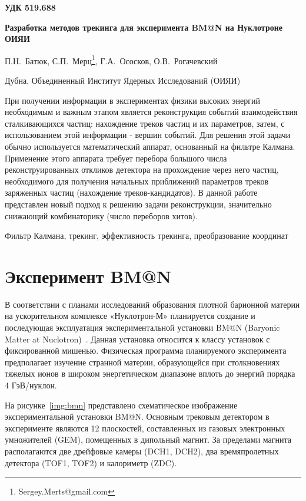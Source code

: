 \documentclass[a4paper, 12pt]{extreport}  %
\begin{document}
\begin{flushleft}
{\bf УДК 519.688}
\end{flushleft}
\begin{center}
\textbf{{Разработка методов трекинга для эксперимента BM@N на Нуклотроне ОИЯИ}}
\newline

П.Н.~Батюк, С.П.~Мерц\footnote{Sergey.Merts@gmail.com}, Г.А.~Ососков, О.В.~Рогачевский
\newline 

Дубна, Объединенный Институт Ядерных Исследований (ОИЯИ)
\end{center}

При получении информации в экспериментах физики высоких энергий необходимым и
важным этапом является реконструкция событий взаимодействия сталкивающихся
частиц: нахождение треков частиц и их параметров, затем, с использованием этой
информации - вершин событий. Для решения этой задачи обычно используется 
математический аппарат, основанный на фильтре Калмана. Применение этого аппарата
требует перебора большого числа реконструированных откликов детектора на
прохождение через него частиц, необходимого для получения начальных приближений
параметров треков заряженных частиц (нахождение треков-кандидатов). В данной
работе представлен новый подход к решению задачи реконструкции, значительно
снижающий комбинаторику (число переборов хитов).
\newline

Фильтр Калмана, трекинг, эффективность трекинга, преобразование координат

\section*{Эксперимент BM@N}

В соответствии с планами исследований образования плотной барионной материи на
ускорительном комплексе «Нуклотрон-М»  планируется создание и последующая
эксплуатация экспериментальной установки BM@N (Baryonic Matter at
Nuclotron)~\cite{bmn}. Данная установка относится к классу установок с
фиксированной мишенью. Физическая программа планируемого эксперимента
предполагает изучение странной материи, образующейся при столкновениях тяжелых
ионов в широком энергетическом диапазоне вплоть до энергий порядка 4 ГэВ/нуклон.

На рисунке~\ref{img:bmn} представлено схематическое изображение
экспериментальной установки BM@N. Основным трековым детектором в эксперименте
являются 12 плоскостей, составленных из газовых электронных умножителей (GEM),
помещенных в дипольный магнит. За пределами магнита располагаются две дрейфовые
камеры (DCH1, DCH2), два времяпролетных детектора (TOF1, TOF2) и калориметр
(ZDC). 
\end{document}
